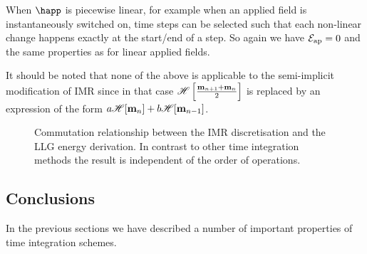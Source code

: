 When $\happ$ is piecewise linear, for example when an applied field is instantaneously switched on, time steps can be selected such that each non-linear change happens exactly at the start/end of a step.
So again we have $\mathcal{E}_\text{ap} = 0$ and the same properties as for linear applied fields.

It should be noted that none of the above is applicable to the semi-implicit modification of IMR since in that case $\mathscr{H} \left[ \frac{\boldsymbol{\mathrm{m}}_{n+1} + \boldsymbol{\mathrm{m}}_n}{2} \right]$ is replaced by an expression of the form $a\mathscr{H} {\left[ \boldsymbol{\mathrm{m}}_n \right]} + b\mathscr{H} {\left[ \boldsymbol{\mathrm{m}}_{n-1} \right]}$.

\begin{figure}
  \centering
  \caption{Commutation relationship between the IMR discretisation and the LLG energy derivation.
In contrast to other time integration methods the result is independent of the order of operations.}
\label{fig:commutation-imr-energy}
\end{figure}


\subsection{Conclusions}

In the previous sections we have described a number of important properties of time integration schemes.

